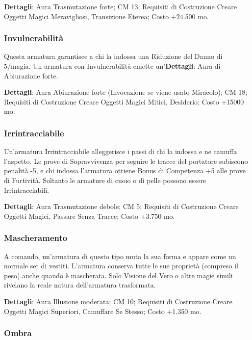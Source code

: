 \begin{multicols}{2}
\textbf{Dettagli}: Aura Trasmutazione forte; CM 13; Requisiti di Costruzione Creare Oggetti Magici Meravigliosi, Transizione Eterea; Costo +24.500 mo.

\subsubsection{Invulnerabilità}

Questa armatura garantisce a chi la indossa una Riduzione del Danno di 5/magia. Un armatura con Invulnerabilità emette un'\textbf{Dettagli}: Aura di Abiurazione forte.

\textbf{Dettagli}: Aura Abiurazione forte (Invocazione se viene usato Miracolo); CM 18; Requisiti di Costruzione Creare Oggetti Magici Mitici, Desiderio; Costo +15000 mo.

\subsubsection{Irrintracciabile}

Un'armatura Irrintracciabile alleggerisce i passi di chi la indossa e ne camuffa l'aspetto. Le prove di Sopravvivenza per seguire le tracce del portatore subiscono penalità -5, e chi indossa l'armatura ottiene Bonus di Competenza +5 alle prove di Furtività. Soltanto le armature di cuoio o di pelle possono essere Irrintracciabili.

\textbf{Dettagli}: Aura Trasmutazione debole; CM 5; Requisiti di Costruzione Creare Oggetti Magici, Passare Senza Tracce; Costo +3.750 mo.

\subsubsection{Mascheramento}

A comando, un'armatura di questo tipo muta la sua forma e appare come un normale set di vestiti. L'armatura conserva tutte le sue proprietà (compreso il peso) anche quando è mascherata. Solo Visione del Vero o altre magie simili rivelano la reale natura dell'armatura trasformata.

\textbf{Dettagli}: Aura Illusione moderata; CM 10; Requisiti di Costruzione Creare Oggetti Magici Superiori, Camuffare Se Stesso; Costo +1.350 mo.

\subsubsection{Ombra}


\end{multicols}
